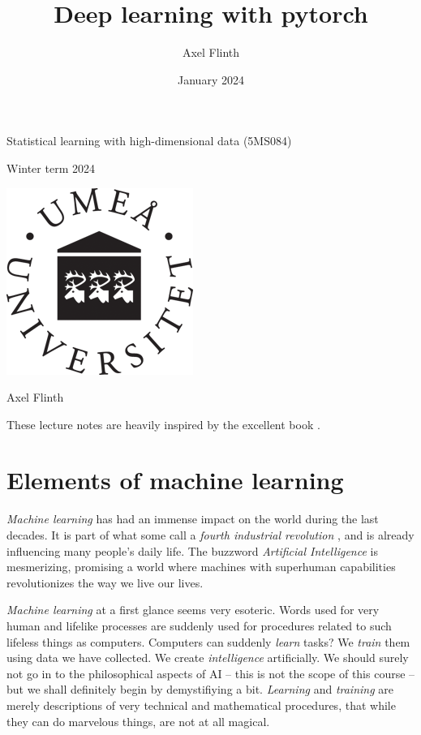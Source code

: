 \documentclass{article}
\title{Deep learning with pytorch}
\author{Axel Flinth}
\date{January 2024}
\begin{document}
\begin{center}

    {\Large Statistical learning with high-dimensional data (5MS084)\\

    \vspace{1.5cm}
    
    Winter term 2024 \\

 \vspace{1.5cm}
    
    \includegraphics[width=.3\textwidth]{graphics/umu.png}

  \vspace{1.5cm}
    
    Axel Flinth}
   
\end{center}

\tableofcontents

These lecture notes are heavily inspired by the excellent book \cite{james2023introduction}.

\newpage


\section{Elements of machine learning}
\emph{Machine learning} has had an immense impact on the world during the last decades. It is part of what some call a \emph{fourth industrial revolution} \cite{SchwabIndustry}, and is already influencing many people's daily life. The buzzword \emph{Artificial Intelligence} is mesmerizing, promising a world where machines with superhuman capabilities revolutionizes the way we live our lives.

\emph{Machine learning} at a first glance seems very esoteric. Words used for very human and lifelike processes are suddenly used for procedures related to such lifeless things as computers. Computers can suddenly \emph{learn} tasks? We \emph{train} them using data we have collected. We create \emph{intelligence} artificially. We should surely not go in to the philosophical aspects of AI -- this is not the scope of this course -- but we shall definitely begin by demystifiying a bit. \emph{Learning} and \emph{training} are merely descriptions of very technical and mathematical procedures, that while they can do marvelous things, are not at all magical.
\end{document}
